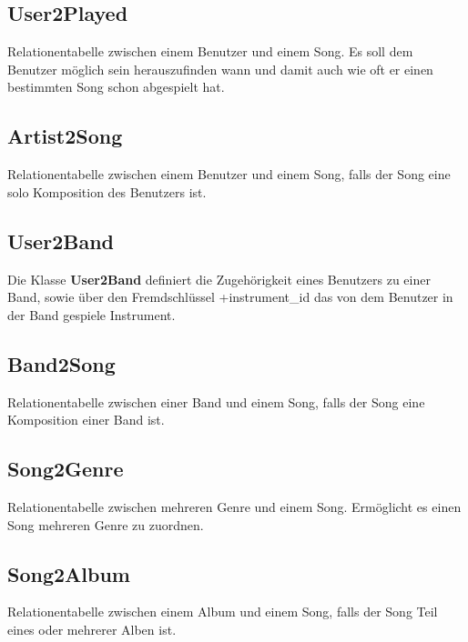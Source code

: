 \documentclass[11pt,a4paper,DIV=9]{scrartcl}
\begin{document}
  \subsection{User2Played}
    Relationentabelle zwischen einem Benutzer und einem Song. Es soll dem Benutzer möglich sein herauszufinden wann und damit auch wie oft er einen bestimmten Song schon abgespielt hat.
  \subsection{Artist2Song}
    Relationentabelle zwischen einem Benutzer und einem Song, falls der Song eine solo Komposition des Benutzers ist.
  \subsection{User2Band}
    Die Klasse \textbf{User2Band} definiert die Zugehörigkeit eines Benutzers zu einer Band, sowie über den Fremdschlüssel +instrument\_id das von dem Benutzer in der Band gespiele Instrument.
  \subsection{Band2Song}
    Relationentabelle zwischen einer Band und einem Song, falls der Song eine Komposition einer Band ist.
  \subsection{Song2Genre}
    Relationentabelle zwischen mehreren Genre und einem Song. Ermöglicht es einen Song mehreren Genre zu zuordnen.
  \subsection{Song2Album}
    Relationentabelle zwischen einem Album und einem Song, falls der Song Teil eines oder mehrerer Alben ist.
\end{document}
